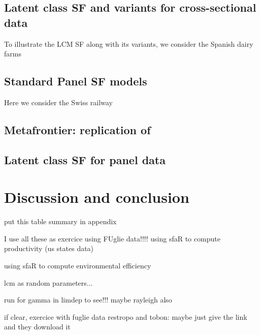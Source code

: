\documentclass[nojss]{jss}
\begin{document}
\subsection{Latent class SF and variants for cross-sectional data}

To illustrate the LCM SF along with its variants, we consider the Spanish dairy 
farms


\subsection{Standard Panel SF models}

Here we consider the Swiss railway

\subsection{Metafrontier: replication of }

\subsection{Latent class SF for panel data}

\section{Discussion and conclusion}

put this table summary in appendix


I use all these as exercice using FUglie data!!!!
using sfaR to compute productivity (us states data)


using sfaR to compute environmental efficiency

lcm as random parameters...

run for gamma in limdep to see!!!
maybe rayleigh also

if clear, exercice with fuglie data
restropo and tobon: maybe just give the link and they download it



\end{document}
